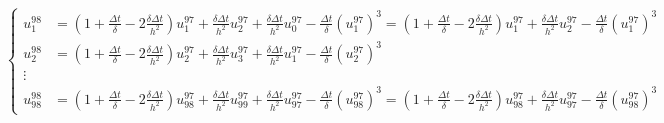 \documentclass{article}
\begin{document}
\[
\renewcommand{\arraystretch}{1.5}
\left\{
\begin{array}{ll}
    u_1^{98} &= (1 + \frac{\Delta t}{\delta} - 2\frac{\delta \Delta t}{h^2})u_1^{97} + \frac{\delta \Delta t}{h^2}u_2^{97} + \frac{\delta \Delta t}{h^2}u_0^{97} - \frac{\Delta t}{\delta}(u_1^{97})^3 = (1 + \frac{\Delta t}{\delta} - 2\frac{\delta \Delta t}{h^2})u_1^{97} + \frac{\delta \Delta t}{h^2}u_2^{97} - \frac{\Delta t}{\delta}(u_1^{97})^3\\
    u_2^{98} &= (1 + \frac{\Delta t}{\delta} - 2\frac{\delta \Delta t}{h^2})u_2^{97} + \frac{\delta \Delta t}{h^2}u_3^{97} + \frac{\delta \Delta t }{h^2}u_1^{97} - \frac{\Delta t }{\delta}(u_2^{97})^3\\
    \vdots\\
    u_{98}^{98} &= (1 + \frac{\Delta t}{\delta} - 2\frac{\delta \Delta t}{h^2})u_{98}^{97} + \frac{\delta \Delta t}{h^2}u_{99}^{97} + \frac{\delta \Delta t }{h^2}u_{97}^{97} - \frac{\Delta t }{\delta}(u_{98}^{97})^3 = (1 + \frac{\Delta t}{\delta} - 2\frac{\delta \Delta t}{h^2})u_{98}^{97} + \frac{\delta \Delta t }{h^2}u_{97}^{97} - \frac{\Delta t }{\delta}(u_{98}^{97})^3
\end{array}
\right.
\]
\end{document}
